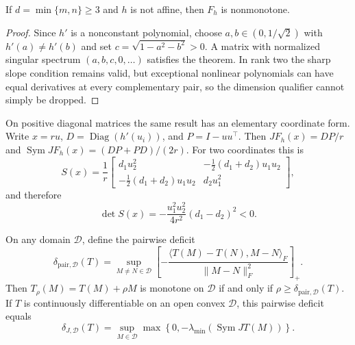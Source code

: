 \begin{corollary}
  If $d=\min\{m,n\}\ge3$ and $h$ is not affine, then $F_h$ is nonmonotone.
\end{corollary}

\begin{proof}
  Since $h'$ is a nonconstant polynomial, choose
  $a,b\in(0,1/\sqrt{2})$ with $h'(a)\ne h'(b)$ and set
  $c=\sqrt{1-a^2-b^2}>0$.  A matrix with normalized singular spectrum
  $(a,b,c,0,\ldots)$ satisfies the theorem.  In rank two the sharp slope
  condition remains valid, but exceptional nonlinear polynomials can have
  equal derivatives at every complementary pair, so the dimension qualifier
  cannot simply be dropped.
\end{proof}

On positive diagonal matrices the same result has an elementary coordinate
form.  Write $x=ru$, $D=\operatorname{Diag}(h'(u_i))$, and $P=I-uu^\top$.
Then $JF_h(x)=DP/r$ and $\operatorname{Sym}JF_h(x)=(DP+PD)/(2r)$.  For two
coordinates this is
\begin{equation}
  S(x)=\frac{1}{r}
  \begin{bmatrix}
    d_1u_2^2 & -\tfrac12(d_1+d_2)u_1u_2\\
    -\tfrac12(d_1+d_2)u_1u_2 & d_2u_1^2
  \end{bmatrix},
\end{equation}
and therefore
\begin{equation}
  \det S(x)
  =-\frac{u_1^2u_2^2}{4r^2}(d_1-d_2)^2<0.
\end{equation}

\begin{proposition}
  On any domain $\mathcal D$, define the pairwise deficit
  \begin{equation}
    \delta_{\mathrm{pair},\mathcal D}(T)
    =\sup_{M\ne N\in\mathcal D}
      \left[
      -\frac{\langle T(M)-T(N),M-N\rangle_F}
      {\lVert M-N\rVert_F^2}\right]_+.
  \end{equation}
  Then $T_\rho(M)=T(M)+\rho M$ is monotone on $\mathcal D$ if and only if
  $\rho\ge\delta_{\mathrm{pair},\mathcal D}(T)$.  If $T$ is continuously
  differentiable on an open convex $\mathcal D$, this pairwise deficit equals
  \begin{equation}
    \delta_{J,\mathcal D}(T)
    =\sup_{M\in\mathcal D}
      \max\!\left\{0,
      -\lambda_{\min}\!\left(\operatorname{Sym}JT(M)\right)\right\}.
  \end{equation}
\end{proposition}

